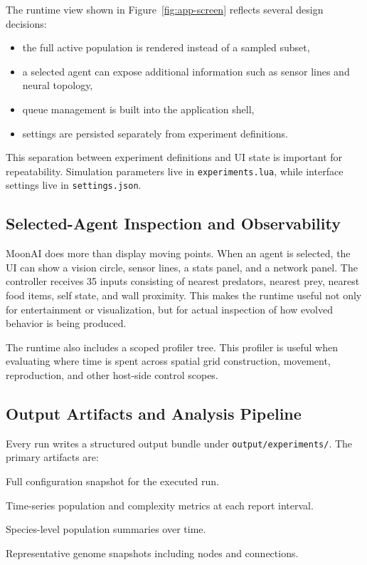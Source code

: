 The runtime view shown in Figure~\ref{fig:app-screen} reflects several design decisions:

\begin{itemize}[nosep]
  \item the full active population is rendered instead of a sampled subset,
  \item a selected agent can expose additional information such as sensor lines and neural
    topology,
  \item queue management is built into the application shell,
  \item settings are persisted separately from experiment definitions.
\end{itemize}

This separation between experiment definitions and UI state is important for repeatability.
Simulation parameters live in \texttt{experiments.lua}, while interface settings live in
\texttt{settings.json}.

\subsection{Selected-Agent Inspection and Observability}

MoonAI does more than display moving points. When an agent is selected, the UI can show a
vision circle, sensor lines, a stats panel, and a network panel. The controller receives 35
inputs consisting of nearest predators, nearest prey, nearest food items, self state, and wall
proximity. This makes the runtime useful not only for entertainment or visualization, but for
actual inspection of how evolved behavior is being produced.

The runtime also includes a scoped profiler tree. This profiler is useful when evaluating where
time is spent across spatial grid construction, movement, reproduction, and other host-side
control scopes.

\subsection{Output Artifacts and Analysis Pipeline}

Every run writes a structured output bundle under \texttt{output/experiments/}. The primary
artifacts are:

\begin{description}[style=nextline,leftmargin=3.5cm,font=\normalfont\ttfamily]
  \item[config.json] Full configuration snapshot for the executed run.
  \item[stats.csv] Time-series population and complexity metrics at each report interval.
  \item[species.csv] Species-level population summaries over time.
  \item[genomes.json] Representative genome snapshots including nodes and connections.
\end{description}

